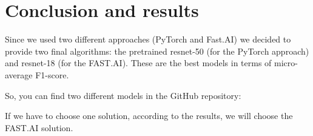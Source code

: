 \section{Conclusion and results}

Since we used two different approaches (PyTorch and Fast.AI) we decided to provide two final algorithms: the pretrained resnet-50 (for the PyTorch approach) and resnet-18 (for the FAST.AI). These are the best models in terms of micro-average F1-score.

So, you can find two different models in the GitHub repository:

If we have to choose one solution, according to the results, we will choose the FAST.AI solution.